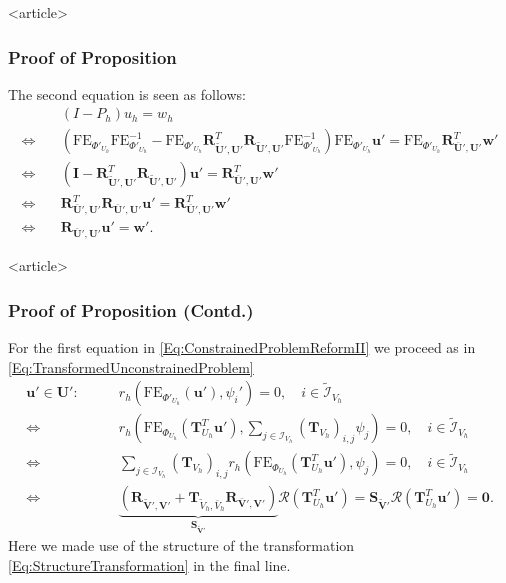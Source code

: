 \begin{frame}<article>
\frametitle<presentation>{Proof of Proposition}
The second equation is seen as follows:
\begin{equation}\label{Eq:SideConditionCoefficient}
\begin{split}
&(I-P_h) u_h = w_h \\
\Leftrightarrow \quad &
\left(\text{FE}_{\Phi'_{U_h}}\text{FE}_{\Phi'_{U_h}}^{-1}
- \text{FE}_{\Phi'_{U_h}}
\mathbf{R}^T_{\tilde{\mathbf{U}}',\mathbf{U}'}
\mathbf{R}_{\tilde{\mathbf{U}}',\mathbf{U}'}
\text{FE}_{\Phi'_{U_h}}^{-1}\right)\text{FE}_{\Phi'_{U_h}}\mathbf{u}'
= \text{FE}_{\Phi'_{U_h}}
\mathbf{R}^T_{\bar{\mathbf{U}}',\mathbf{U}'} \mathbf{w}'\\
\Leftrightarrow \quad &
\left( \mathbf{I} - \mathbf{R}^T_{\tilde{\mathbf{U}}',\mathbf{U}'}
\mathbf{R}_{\tilde{\mathbf{U}}',\mathbf{U}'}\right) \mathbf{u}' =
\mathbf{R}^T_{\bar{\mathbf{U}}',\mathbf{U}'} \mathbf{w}' \\
\Leftrightarrow \quad &
\mathbf{R}^T_{\bar{\mathbf{U}}',\mathbf{U}'}
\mathbf{R}_{\bar{\mathbf{U}}',\mathbf{U}'} \mathbf{u}' =
\mathbf{R}^T_{\bar{\mathbf{U}}',\mathbf{U}'} \mathbf{w}'\\
\Leftrightarrow \quad &
\mathbf{R}_{\bar{\mathbf{U}}',\mathbf{U}'} \mathbf{u}' = \mathbf{w}' .
\end{split}
\end{equation}
\end{frame}

\begin{frame}<article>
\frametitle<presentation>{Proof of Proposition (Contd.)}
For the first equation in \eqref{Eq:ConstrainedProblemReformII}
we proceed as in \eqref{Eq:TransformedUnconstrainedProblem}
\begin{equation}\label{Eq:TransformedConstrainedProblem2}
\begin{split}
\mathbf{u}'\in\mathbf{U}' : \qquad
& r_h\left(\text{FE}_{\Phi'_{U_h}}(\mathbf{u}'),\psi_i'\right) = 0, \quad
i\in\tilde{\mathcal{I}}_{V_h}\\
\Leftrightarrow \  &
r_h\left(\text{FE}_{\Phi_{U_h}}(\mathbf{T}^T_{U_h}\mathbf{u}'),
\sum_{j\in\mathcal{I}_{V_h}}\left(\mathbf{T}_{V_h}\right)_{i,j}\psi_j\right) = 0, \quad
i\in\tilde{\mathcal{I}}_{V_h}\\
\Leftrightarrow \  &
\sum_{j\in\mathcal{I}_{V_h}} \left(\mathbf{T}_{V_h}\right)_{i,j}
r_h\left(\text{FE}_{\Phi_{U_h}}(\mathbf{T}^T_{U_h}\mathbf{u}'),
\psi_j\right) = 0, \quad
i\in\tilde{\mathcal{I}}_{V_h}\\
\Leftrightarrow \  &
\underbrace{\left(\mathbf{R}_{\tilde{\mathbf{V}}',\mathbf{V}'} +
\mathbf{T}_{\tilde{V}_h,\bar{V}_h}\mathbf{R}_{\bar{\mathbf{V}}',\mathbf{V}'}
\right)}_{\mathbf{S}_{\tilde{\mathbf{V}}'}}\mathcal{R}\left(\mathbf{T}^T_{U_h}\mathbf{u}'\right)=
\mathbf{S}_{\tilde{\mathbf{V}}'} \mathcal{R}\left(\mathbf{T}^T_{U_h}\mathbf{u}'\right)
= \mathbf{0} .
\end{split}
\end{equation}
Here we made use of the structure of the transformation
\eqref{Eq:StructureTransformation} in the final line.
\end{frame}


